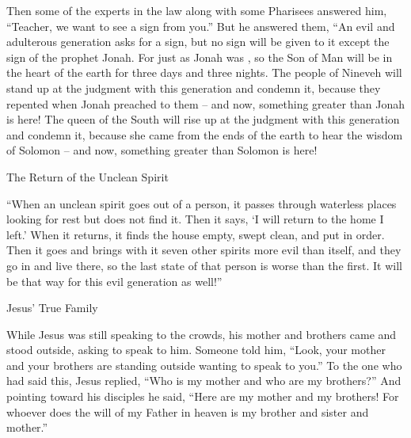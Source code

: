 {\par }{\PP {}Then
some
of the experts in the law
along with
some Pharisees
answered
him, “Teacher,
we want
to see
a sign
from
you.”
But
he answered
them, “An evil
and
adulterous
generation
asks for
a sign,
but
no
sign
will be given
to it
except
the sign
of the prophet
Jonah.
For
just as
Jonah
was
{}, so
the Son
of Man
will be
in
the heart
of the earth
for three
days
and
three
nights.
The people
of Nineveh
will stand up
at
the judgment
with
this
generation
and
condemn
it,
because
they repented
when Jonah
preached to them – and now, something greater than Jonah is here!
The queen
of the South
will rise up
at
the judgment
with
this
generation
and
condemn
it,
because
she came
from
the ends
of the earth
to hear
the wisdom
of Solomon
– and
now,
something greater than
Solomon
is here!
\par }{\SH The Return of the Unclean Spirit
\par }{\PP {}“When
an unclean
spirit
goes out
of
a person,
it passes
through
waterless
places
looking
for rest
but
does
not
find it.
Then
it says,
‘I will return
to
the home
I left.’
When
it returns,
it finds
the house empty,
swept clean,
and
put in order.
Then
it goes
and
brings
with
it
seven
other
spirits
more evil
than itself,
and
they go in
and live
there,
so the last state
of that
person
is
worse than
the first.
It will be
that way
for this
evil
generation as well!”
\par }{\SH Jesus’ True Family
\par }{\PP {}While Jesus
was
still
speaking
to the crowds,
his
mother
and
brothers
came and stood
outside,
asking
to speak
to him.
Someone told him, “Look, your mother and your brothers are standing outside wanting to speak to you.”
To the one
who had said
this, Jesus replied, “Who
is
my
mother
and
who
are
my
brothers?”
And
pointing
toward
his
disciples
he said,
“Here
are my
mother
and
my
brothers!
For
whoever
does
the will
of my
Father
in
heaven
is
my
brother
and
sister
and
mother.”

}
